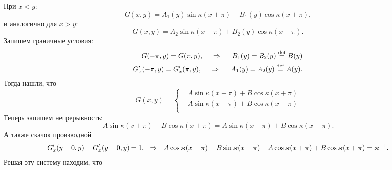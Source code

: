 При $x < y$:
\begin{equation*}
    G(x, y) = A_1 (y) \sin \kappa(x + \pi) + B_1 (y) \cos \kappa( x + \pi),
\end{equation*}
и аналогично для $x > y$:
\begin{equation*}
    G(x, y) = A_2 \sin \kappa (x - \pi) + B_2 (y) \cos \kappa (x - \pi).
\end{equation*}
Запишем граничные условия:
\begin{align*}
    G(- \pi, y) = G(\pi, y), \hspace{0.5cm} \Rightarrow \hspace{0.5cm}
    B_1 (y) = B_2 (y) \overset{\mathrm{def}}{=} B(y) \\
    G'_x (-\pi, y) = G'_x (\pi, y),
    \hspace{0.5cm} \Rightarrow \hspace{0.5cm}
    A_1 (y) = A_2 (y) \overset{\mathrm{def}}{=}  A(y).
\end{align*}
Тогда нашли, что
\begin{equation*}
    G(x, y) = \left\{\begin{aligned}
        &A \sin \kappa (x + \pi) + B \cos \kappa (x + \pi) \\
        &A \sin \kappa (x - \pi) + B \cos \kappa (x - \pi) \\
    \end{aligned}\right.
\end{equation*}
Теперь запишем непрерывность:
\begin{equation*}
     A \sin \kappa (x + \pi) + B \cos \kappa (x + \pi) 
     = 
     A \sin \kappa (x - \pi) + B \cos \kappa (x - \pi).
\end{equation*}
А также скачок производной
\begin{equation*}
    G'_x(y + 0, y) - G'_x (y-0, y) = 1,
    \hspace{0.25cm} \Rightarrow \hspace{0.25cm}
        A \cos \kappa (x - \pi) - B \sin \kappa (x - \pi)  - 
        A \cos \kappa (x + \pi) + B \cos \kappa (x + \pi)
        = \kappa^{-1}.
\end{equation*}
Решая эту систему находим, что
